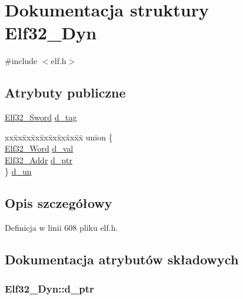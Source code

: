 \hypertarget{struct_elf32___dyn}{\section{Dokumentacja struktury Elf32\-\_\-\-Dyn}
\label{struct_elf32___dyn}
}


{\ttfamily \#include $<$elf.\-h$>$}

\subsection*{Atrybuty publiczne}
\begin{DoxyCompactItemize}
\item 
\hyperlink{elf_8h_a30ce6352cf03c667272698ada477da95}{Elf32\-\_\-\-Sword} \hyperlink{struct_elf32___dyn_a0edbe45a1c49cbb352dc3e1937369180}{d\-\_\-tag}
\item 
\begin{tabbing}
xx\=xx\=xx\=xx\=xx\=xx\=xx\=xx\=xx\=\kill
union \{\\
\>\hyperlink{elf_8h_af5924ece606c732e86f8263a19408e45}{Elf32\_Word} \hyperlink{struct_elf32___dyn_a00a89085454a384ae77fd9112b3062c7}{d\_val}\\
\>\hyperlink{elf_8h_a40c6d4571e6001f443cc6a6474620158}{Elf32\_Addr} \hyperlink{struct_elf32___dyn_adcdb4fa1682c07a7e7874c99f9cbd028}{d\_ptr}\\
\} \hyperlink{struct_elf32___dyn_ae099cc9b66d91c8d96a079c748491c99}{d\_un}\\

\end{tabbing}\end{DoxyCompactItemize}


\subsection{Opis szczegółowy}


Definicja w linii 608 pliku elf.\-h.



\subsection{Dokumentacja atrybutów składowych}
\hypertarget{struct_elf32___dyn_adcdb4fa1682c07a7e7874c99f9cbd028}{
\subsubsection[{d\-\_\-ptr}]{ Elf32\-\_\-\-Dyn\-::d\-\_\-ptr}}\label{struct_elf32___dyn_adcdb4fa1682c07a7e7874c99f9cbd028}


